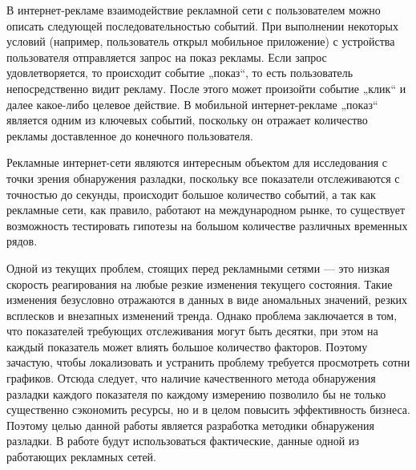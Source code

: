 \documentclass[%
12pt,
master,  %
natbib,      %
subf,        %
substylefile = spbu.rtx,
href,        %
colorlinks,  %
]{disser}
\begin{document}
В интернет-рекламе взаимодействие рекламной сети с пользователем можно описать следующей последовательностью событий. При выполнении некоторых условий (например, пользователь открыл мобильное приложение) с устройства пользователя отправляется запрос на показ рекламы. Если запрос удовлетворяется, то происходит событие „показ“, то есть пользователь непосредственно видит рекламу. После этого может произойти событие „клик“ и далее какое-либо целевое действие. В мобильной интернет-рекламе „показ“ является одним из ключевых событий, поскольку он отражает количество рекламы доставленное до конечного пользователя. 

Рекламные интернет-сети являются интересным объектом для исследования с точки зрения обнаружения разладки, поскольку все показатели отслеживаются с точностью до секунды, происходит большое количество событий, а так как рекламные сети, как правило, работают на международном рынке, то существует возможность тестировать гипотезы на большом количестве различных временных рядов.

Одной из текущих проблем, стоящих перед рекламными сетями --- это низкая скорость реагирования на любые резкие изменения текущего состояния. Такие изменения безусловно отражаются в данных в виде аномальных значений, резких всплесков и внезапных изменений тренда. Однако проблема заключается в том, что показателей требующих отслеживания могут быть десятки, при этом на каждый показатель может влиять большое количество факторов. Поэтому зачастую, чтобы локализовать и устранить проблему требуется просмотреть сотни графиков. Отсюда следует, что наличие качественного метода обнаружения разладки каждого показателя по каждому измерению позволило бы не только существенно сэкономить ресурсы, но и в целом повысить эффективность бизнеса. Поэтому целью данной работы является разработка методики обнаружения разладки. В работе будут использоваться фактические, данные одной из работающих рекламных сетей.
\end{document}
